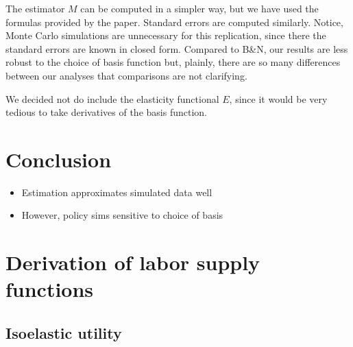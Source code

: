 \documentclass[11pt,letterpaper]{article}                  %
\begin{document}
The estimator $M$ can be computed in a simpler way, but we have used the formulas provided by the paper.
Standard errors are computed similarly. 
Notice, Monte Carlo simulations are unnecessary for this replication,
since there the standard errors are known in closed form.
Compared to B\&N, our results are less robust to the choice of basis function but, plainly, there are so many differences between our analyses that comparisons are not clarifying.

We decided not do include the elasticity functional $E$, since it would be very tedious to take derivatives of the basis function.

\section{Conclusion}
\label{sec:conclusion}
\begin{itemize}
\item Estimation approximates simulated data well
\item However, policy sims sensitive to choice of basis
\end{itemize}







\appendix

\section{Derivation of labor supply functions}

\subsection{Isoelastic utility}
\label{app:iso}
\end{document}
